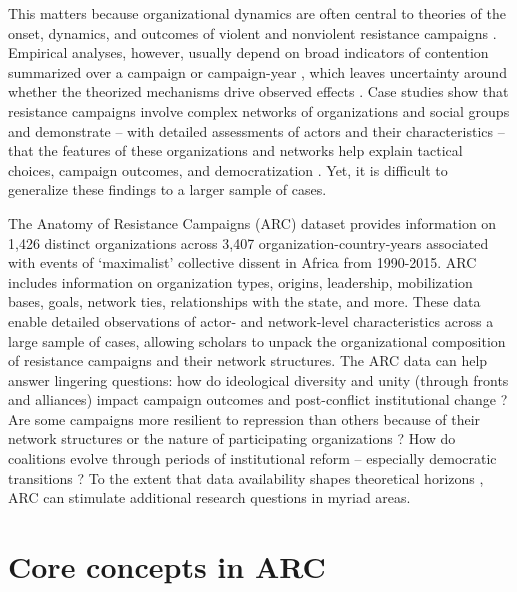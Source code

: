 This matters because organizational dynamics are often central to theories of
the onset, dynamics, and outcomes of violent and nonviolent resistance campaigns
\citep{Bethke2019a, Brancati2016, Chenoweth2011, Celestino2013, Huang2016,
Schaftenaar2017, Thurber2019, Sutton2014, Svensson2011, Belgioioso2018}.
Empirical analyses, however, usually depend on broad indicators of contention
summarized over a campaign or campaign-year \citep{Chenoweth2011}, which leaves
uncertainty around whether the theorized mechanisms drive observed effects
\citep{Schock2005}. Case studies show that resistance campaigns involve complex
networks of organizations and social groups \citep{Metternich2013, Schock2005,
Osa2003} and demonstrate -- with detailed assessments of actors and their
characteristics -- that the features of these organizations and networks help
explain tactical choices, campaign outcomes, and democratization
\citep{Pearlman2011, Thurber2019, Nepstad2011, Schock2005, Wood2000,
Collier1999}. Yet, it is difficult to generalize these findings to a larger
sample of cases.  

The Anatomy of Resistance Campaigns (ARC) dataset provides information on 1,426
distinct organizations across 3,407 organization-country-years associated with
events of `maximalist' collective dissent in Africa from 1990-2015. ARC includes
information on organization types, origins, leadership, mobilization bases,
goals, network ties, relationships with the state, and more. These data enable
detailed observations of actor- and network-level characteristics across a large
sample of cases, allowing scholars to unpack the organizational composition of
resistance campaigns and their network structures. The ARC data can help answer
lingering questions: how do ideological diversity and unity (through fronts and
alliances) impact campaign outcomes and post-conflict institutional change
\citep{Chenoweth2011, Bayer2016, Celestino2013}? Are some campaigns more
resilient to repression than others because of their network structures or the
nature of participating organizations \citep{Sutton2014, Siegel2009}? How do
coalitions evolve through periods of institutional reform -- especially
democratic transitions \citep{Pinckney2020}? To the extent that data
availability shapes theoretical horizons \citep{Gleditsch2014}, ARC can
stimulate additional research questions in myriad areas.

\section{Core concepts in ARC}

